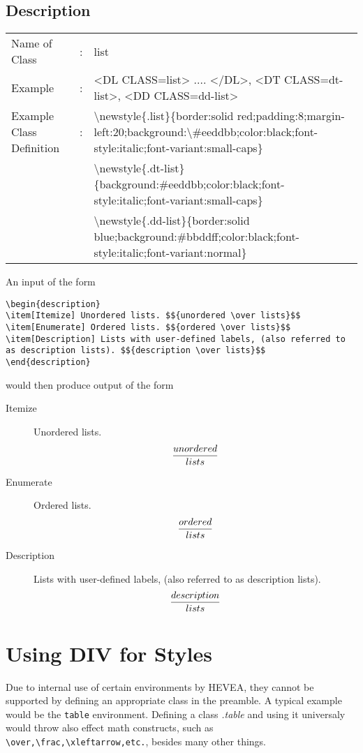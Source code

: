 \documentclass {article}
\begin{document}
\subsection{Description}
\begin{tabular}{lll}
Name of Class & : & list\\
Example & : & <DL CLASS=list> .... </DL>, <DT CLASS=dt-list>, <DD CLASS=dd-list>\\
Example Class Definition & : & $\setminus$newstyle\{.list\}\{border:solid red;padding:8;margin-left:20;background:$\setminus$\#eeddbb;color:black;font-style:italic;font-variant:small-caps\}\\
 & & $\setminus$newstyle\{.dt-list\}\{background:\#eeddbb;color:black;font-style:italic;font-variant:small-caps\}\\
 & & $\setminus$newstyle\{.dd-list\}\{border:solid blue;background:\#bbddff;color:black;font-style:italic;font-variant:normal\}\\
\end{tabular}

An input of the form
\begin{verbatim}
\begin{description}
\item[Itemize] Unordered lists. $${unordered \over lists}$$
\item[Enumerate] Ordered lists. $${ordered \over lists}$$
\item[Description] Lists with user-defined labels, (also referred to as description lists). $${description \over lists}$$ 
\end{description}
\end{verbatim}
would then produce output of the form
\begin{description}
\item[Itemize] Unordered lists. $${unordered \over lists}$$
\item[Enumerate] Ordered lists. $${ordered \over lists}$$
\item[Description] Lists with user-defined labels, (also referred to as description lists). $${description \over lists}$$ 
\end{description}

\section{Using DIV for Styles}
Due to internal use of certain environments by HEVEA, they cannot be supported by defining an appropriate class in the preamble. A typical example would be the \texttt{table} environment. Defining a class \emph{.table} and using it universaly would throw also effect math constructs, such as \verb+\over,\frac,\xleftarrow,etc.+, besides many other things.
\end{document}
